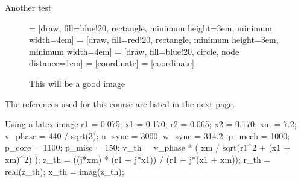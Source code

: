 \documentclass{report}
\newcommand{\re}{\mathrm{ref}}
\theoremstyle{plain}
\theoremstyle{definition}
\theoremstyle{remark}
\begin{document}
Another test 
\begin{figure}
\centering
\begin{lateximage}
 = [draw, fill=blue!20, rectangle, minimum height=3em, minimum width=4em]
 = [draw, fill=red!20, rectangle, minimum height=3em, minimum width=4em]
 = [draw, fill=blue!20, circle, node distance=1cm]
 = [coordinate]
 = [coordinate]
\end{lateximage}
\caption{This will be a good image}
\end{figure}
\nocite{*}

The references used for this course are listed in the next page.  \\

\begin{lateximage}
\begin{matlaboutput}{Using a latex image}
	r1 = 0.075; %
	x1 = 0.170; %
	r2 = 0.065; %
	x2 = 0.170; %
	xm = 7.2; %
	v_phase = 440 / sqrt(3); %
	n_sync = 3000; %
	w_sync = 314.2; %
	p_mech = 1000; %
	p_core = 1100; %
	p_misc = 150; %
	v_th = v_phase * ( xm / sqrt(r1^2 + (x1 + xm)^2) );
	z_th = ((j*xm) * (r1 + j*x1)) / (r1 + j*(x1 + xm));
	r_th = real(z_th);
	x_th = imag(z_th);
\end{matlaboutput}
\end{lateximage}
\end{document}
